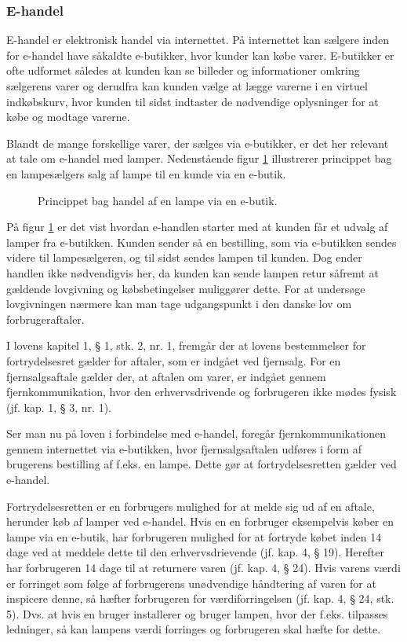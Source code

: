 \subsubsection{E-handel}
E-handel er elektronisk handel via internettet\cite{ddo_ehandel}. På internettet kan sælgere inden for e-handel have såkaldte e-butikker, hvor kunder kan købe varer\cite{ddo_ebutik}. E-butikker er ofte udformet således at kunden kan se billeder og informationer omkring sælgerens varer og derudfra kan kunden vælge at lægge varerne i en virtuel indkøbskurv, hvor kunden til sidst indtaster de nødvendige oplysninger for at købe og modtage varerne.


Blandt de mange forskellige varer, der sælges via e-butikker, er det her relevant at tale om e-handel med lamper. Nedenstående figur \ref{fig:e_handel_med_lamper} illustrerer princippet bag en lampesælgers salg af lampe til en kunde via en e-butik.
\begin{figure}[H]
	\centering
	\def\svgwidth{\columnwidth}
	
	\caption{Princippet bag handel af en lampe via en e-butik.}
    \label{fig:e_handel_med_lamper}
\end{figure}

På figur \ref{fig:e_handel_med_lamper} er det vist hvordan e-handlen starter med at kunden får et udvalg af lamper fra e-butikken. Kunden sender så en bestilling, som via e-butikken sendes videre til lampesælgeren, og til sidst sendes lampen til kunden. Dog ender handlen ikke nødvendigvis her, da kunden kan sende lampen retur såfremt at gældende lovgivning og købsbetingelser muliggører dette. For at undersøge lovgivningen nærmere kan man tage udgangspunkt i den danske lov om forbrugeraftaler\cite{retsinformationen}.

I lovens kapitel 1, § 1, stk. 2, nr. 1, fremgår der at lovens bestemmelser for fortrydelsesret gælder for aftaler, som er indgået ved fjernsalg. For en  fjernsalgsaftale gælder der, at aftalen om varer, er indgået gennem fjernkommunikation, hvor den erhvervsdrivende og forbrugeren ikke mødes fysisk (jf. kap. 1, § 3, nr. 1).

Ser man nu på loven i forbindelse med e-handel, foregår fjernkommunikationen gennem internettet via e-butikken, hvor fjernsalgsaftalen udføres i form af brugerens bestilling af f.eks. en lampe. Dette gør at fortrydelsesretten gælder ved e-handel.

Fortrydelsesretten er en forbrugers mulighed for at melde sig ud af en aftale, herunder køb af lamper ved e-handel. Hvis en en forbruger eksempelvis køber en lampe via en e-butik, har forbrugeren mulighed for at fortryde købet inden 14 dage ved at meddele dette til den erhvervsdrievende (jf. kap. 4, § 19). Herefter har forbrugeren 14 dage til at returnere varen (jf. kap. 4, § 24). Hvis varens værdi er forringet som følge af forbrugerens unødvendige håndtering af varen for at inspicere denne, så hæfter forbrugeren for værdiforringelsen (jf. kap. 4, § 24, stk. 5). Dvs. at hvis en bruger installerer og bruger lampen, hvor der f.eks. tilpasses ledninger, så kan lampens værdi forringes og forbrugeren skal hæfte for dette. 

